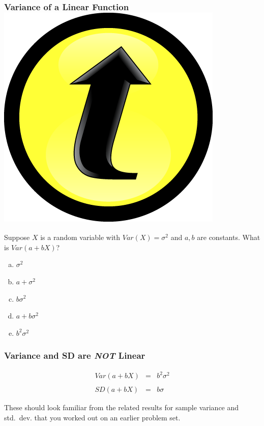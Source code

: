 \documentclass[handout]{beamer}
\begin{document}
\begin{frame}
\frametitle{Variance of a Linear Function  \hfill \includegraphics[scale = 0.05]{./images/clicker} }
Suppose $X$ is a random variable with $Var(X) = \sigma^2$ and $a,b$ are constants. What is $Var(a + bX)$? 
\begin{enumerate}[(a)]
	\item $\sigma^2$
	\item $a + \sigma^2$
	\item $b \sigma^2$
	\item $a + b \sigma^2$
	\item $b^2 \sigma^2$
\end{enumerate}

\end{frame}
\begin{frame}
	\frametitle{Variance and SD are \emph{NOT} Linear}

\begin{eqnarray*}
Var(a + bX) &= &b^2 \sigma^2 \\\\
	SD(a + bX)&=& b \sigma
\end{eqnarray*}

\vspace{2em}
\begin{block}{These should look familiar from the related results for sample variance and std.\ dev. that you worked out on an earlier problem set.}

\end{block}

\end{frame}
\end{document}
